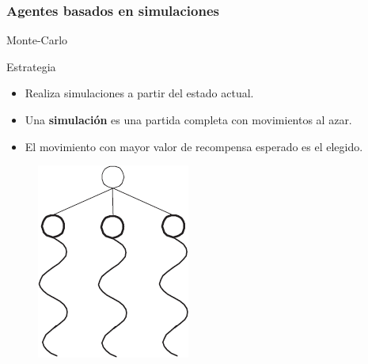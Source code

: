 \documentclass[10pt]{beamer}
\begin{document}
\begin{frame}[squeeze]
\frametitle{Agentes basados en simulaciones}

{\huge Monte-Carlo}

\begin{block}{Estrategia}
{\small
%
\begin{itemize}
			\item Realiza simulaciones a partir del estado actual.
			\item Una \textbf{simulación} es una partida completa con movimientos al azar.
			\item El movimiento con mayor valor de recompensa esperado es el elegido.
		\end{itemize}
\begin{figure}[t]
\centering
\includegraphics[scale=0.4]{imagenes/montecarlo2.png}
\label{fig:jug_montecarlo}
\end{figure}		
}
\end{block}


\end{frame}
\end{document}
